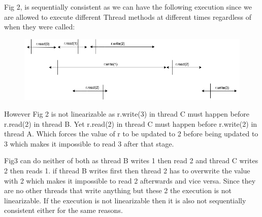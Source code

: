 \documentclass[11pt,letterpaper]{exam}
\begin{document}
\begin{questions}
		\newpage
		\question
		Fig 2, is sequentially consistent as we can have the following execution since we are allowed to execute different Thread methods at different times regardless of when they were called:
		\begin{figure}[h!]
			\centering
			\includegraphics[scale=0.4]{Fig2Sequential}
		\end{figure}
		
		However Fig 2 is not linearizable as r.write(3) in thread C must happen before r.read(2) in thread B. Yet r.read(2) in thread C must happen before r.write(2) in thread A. Which forces the value of r to be updated to 2 before being updated to 3 which makes it impossible to read 3 after that stage.
		
		Fig3 can do neither of both as thread B writes 1 then read 2 and thread C writes 2 then reads 1. if thread B writes first then thread 2 has to overwrite the value with 2 which makes it impossible to read 2 afterwards and vice versa. Since they are no other threads that write anything but these 2 the execution is not linearizable. If the execution is not linearizable then it is also not sequentially consistent either for the same reasons.
		
		\question
\end{questions}
\end{document}
